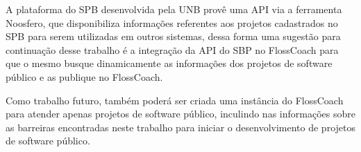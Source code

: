 A plataforma do SPB desenvolvida pela UNB provê uma API via a ferramenta Noosfero,
que disponibiliza informações referentes aos projetos cadastrados no SPB para
serem utilizadas em outros sistemas, dessa forma uma sugestão para continuação
desse trabalho é a integração da API do SBP no FlossCoach para que o mesmo 
busque dinamicamente as informações dos projetos de software público e as
publique no FlossCoach.

Como trabalho futuro, também poderá ser criada uma instância do FlossCoach para
atender apenas projetos de software público, inculindo nas informações sobre
as barreiras encontradas neste trabalho para iniciar o desenvolvimento de 
projetos de software público.


